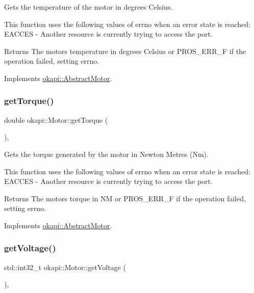 Gets the temperature of the motor in degrees Celsius.

This function uses the following values of errno when an error state is reached\+: E\+A\+C\+C\+ES -\/ Another resource is currently trying to access the port.

\begin{DoxyReturn}{Returns}
The motor\textquotesingle{}s temperature in degrees Celsius or P\+R\+O\+S\+\_\+\+E\+R\+R\+\_\+F if the operation failed, setting errno. 
\end{DoxyReturn}


Implements \mbox{\hyperlink{classokapi_1_1AbstractMotor_a96ef2dc7eeb1ac23713e3e37af9e95f2}{okapi\+::\+Abstract\+Motor}}.

\mbox{\label{classokapi_1_1Motor_a4a8c14c49ae44d687772ff41591fdf1d}} 
\subsubsection{\texorpdfstring{getTorque()}{getTorque()}}
{\footnotesize\ttfamily double okapi\+::\+Motor\+::get\+Torque (\begin{DoxyParamCaption}{ }\end{DoxyParamCaption})\hspace{0.3cm}{\ttfamily [override]}, {\ttfamily [virtual]}}

Gets the torque generated by the motor in Newton Metres (Nm).

This function uses the following values of errno when an error state is reached\+: E\+A\+C\+C\+ES -\/ Another resource is currently trying to access the port.

\begin{DoxyReturn}{Returns}
The motor\textquotesingle{}s torque in NM or P\+R\+O\+S\+\_\+\+E\+R\+R\+\_\+F if the operation failed, setting errno. 
\end{DoxyReturn}


Implements \mbox{\hyperlink{classokapi_1_1AbstractMotor_a955818baa689b279b36dda6a74f15d4e}{okapi\+::\+Abstract\+Motor}}.

\mbox{\label{classokapi_1_1Motor_af60eb970996183d86bd4786869f5adb0}} 
\subsubsection{\texorpdfstring{getVoltage()}{getVoltage()}}
{\footnotesize\ttfamily std\+::int32\+\_\+t okapi\+::\+Motor\+::get\+Voltage (\begin{DoxyParamCaption}{ }\end{DoxyParamCaption})\hspace{0.3cm}{\ttfamily [override]}, {\ttfamily [virtual]}}

